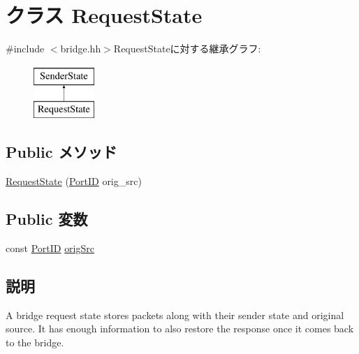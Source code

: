 \hypertarget{classBridge_1_1RequestState}{
\section{クラス RequestState}
\label{classBridge_1_1RequestState}
}


{\ttfamily \#include $<$bridge.hh$>$}RequestStateに対する継承グラフ:\begin{figure}[H]
\begin{center}
\leavevmode
\includegraphics[height=2cm]{classBridge_1_1RequestState}
\end{center}
\end{figure}
\subsection*{Public メソッド}
\begin{DoxyCompactItemize}
\item 
\hyperlink{classBridge_1_1RequestState_ab4bed3856376340b350fdbb41426b6bf}{RequestState} (\hyperlink{base_2types_8hh_acef4d7d41cb21fdc252e20c04cd7bb8e}{PortID} orig\_\-src)
\end{DoxyCompactItemize}
\subsection*{Public 変数}
\begin{DoxyCompactItemize}
\item 
const \hyperlink{base_2types_8hh_acef4d7d41cb21fdc252e20c04cd7bb8e}{PortID} \hyperlink{classBridge_1_1RequestState_a1bef1751da1364a39c90d19004b816a0}{origSrc}
\end{DoxyCompactItemize}


\subsection{説明}
A bridge request state stores packets along with their sender state and original source. It has enough information to also restore the response once it comes back to the bridge. 

